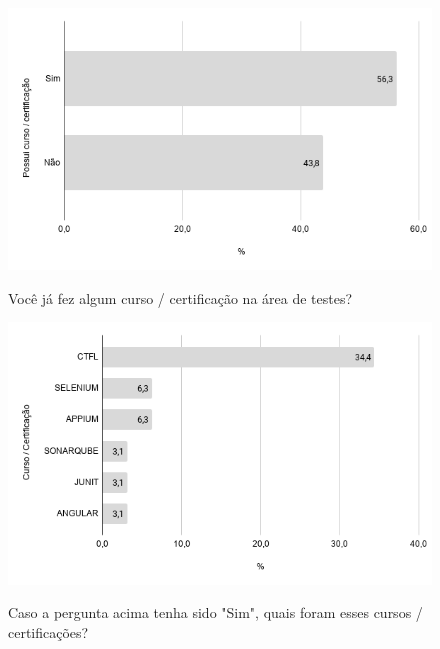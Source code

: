     
        \begin{figure}[!htb]
        \centering
        \includegraphics[width=.80\textwidth]{images/s_certificacao.png}
        \label{figure:s_certificacao}
        \caption{Você já fez algum curso / certificação na área de testes?}
        \end{figure}
    
    
        \begin{figure}[!htb]
        \centering
        \includegraphics[width=.80\textwidth]{images/s_certificacaodesc.png}
        \label{figure:s_certificacaodesc}
        \caption{Caso a pergunta acima tenha sido "Sim", quais foram esses cursos / certificações?}
        \end{figure}
    
